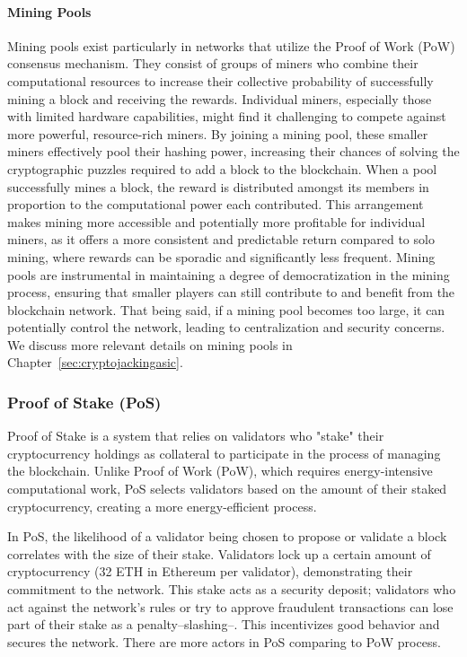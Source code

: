 \paragraph{Mining Pools}
Mining pools exist particularly in networks that utilize the Proof of Work (PoW) consensus mechanism. They consist of groups of miners who combine their computational resources to increase their collective probability of successfully mining a block and receiving the rewards. Individual miners, especially those with limited hardware capabilities, might find it challenging to compete against more powerful, resource-rich miners. By joining a mining pool, these smaller miners effectively pool their hashing power, increasing their chances of solving the cryptographic puzzles required to add a block to the blockchain. When a pool successfully mines a block, the reward is distributed amongst its members in proportion to the computational power each contributed. This arrangement makes mining more accessible and potentially more profitable for individual miners, as it offers a more consistent and predictable return compared to solo mining, where rewards can be sporadic and significantly less frequent. Mining pools are instrumental in maintaining a degree of democratization in the mining process, ensuring that smaller players can still contribute to and benefit from the blockchain network. That being said, if a mining pool becomes too large, it can potentially control the network, leading to centralization and security concerns. We discuss more relevant details on mining pools in Chapter~\ref{sec:cryptojackingasic}.



\subsubsection{Proof of Stake (PoS)}
Proof of Stake is a system that relies on validators who "stake" their cryptocurrency holdings as collateral to participate in the process of managing the blockchain. Unlike Proof of Work (PoW), which requires energy-intensive computational work, PoS selects validators based on the amount of their staked cryptocurrency, creating a more energy-efficient process.

In PoS, the likelihood of a validator being chosen to propose or validate a block correlates with the size of their stake. Validators lock up a certain amount of cryptocurrency (32 ETH in Ethereum per validator), demonstrating their commitment to the network. This stake acts as a security deposit; validators who act against the network's rules or try to approve fraudulent transactions can lose part of their stake as a penalty--slashing--. This incentivizes good behavior and secures the network. There are more actors in PoS comparing to PoW process.

